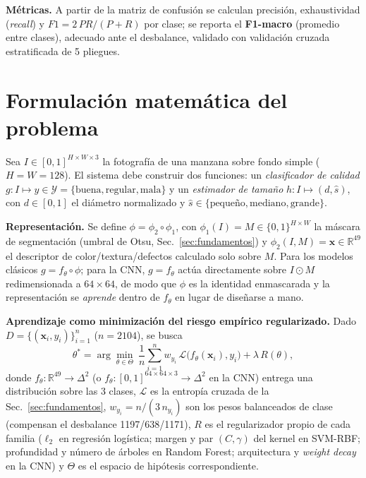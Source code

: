 \documentclass[conference]{IEEEtran}
\begin{document}
\textbf{Métricas.} A partir de la matriz de confusión se calculan precisión,
exhaustividad (\emph{recall}) y $F1=2\,PR/(P+R)$ por clase; se reporta el
\textbf{F1-macro} (promedio entre clases), adecuado ante el desbalance, validado
con validación cruzada estratificada de 5 pliegues.

\section{Formulación matemática del problema}
\label{sec:formulacion}
Sea $I\in[0,1]^{H\times W\times 3}$ la fotografía de una manzana sobre fondo
simple ($H=W=128$). El sistema debe construir dos funciones: un
\emph{clasificador de calidad} $g:I\mapsto y\in\mathcal{Y}=\{\text{buena},
\text{regular},\text{mala}\}$ y un \emph{estimador de tamaño}
$h:I\mapsto(d,\hat s)$, con $d\in[0,1]$ el diámetro normalizado y $\hat
s\in\{\text{pequeño},\text{mediano},\text{grande}\}$.

\textbf{Representación.} Se define $\phi=\phi_2\circ\phi_1$, con
$\phi_1(I)=M\in\{0,1\}^{H\times W}$ la máscara de segmentación (umbral de Otsu,
Sec.~\ref{sec:fundamentos}) y $\phi_2(I,M)=\mathbf{x}\in\mathbb{R}^{49}$ el
descriptor de color/textura/defectos calculado solo sobre $M$. Para los modelos
clásicos $g=f_\theta\circ\phi$; para la CNN, $g=f_\theta$ actúa directamente
sobre $I\odot M$ redimensionada a $64\times64$, de modo que $\phi$ es la
identidad enmascarada y la representación se \emph{aprende} dentro de
$f_\theta$ en lugar de diseñarse a mano.

\textbf{Aprendizaje como minimización del riesgo empírico regularizado.} Dado
$D=\{(\mathbf{x}_i,y_i)\}_{i=1}^{n}$ ($n=2104$), se busca
\[
\theta^\ast=\arg\min_{\theta\in\Theta}\ \frac{1}{n}\sum_{i=1}^{n}
w_{y_i}\,\mathcal{L}\big(f_\theta(\mathbf{x}_i),y_i\big)+\lambda\,R(\theta),
\]
donde $f_\theta:\mathbb{R}^{49}\to\Delta^{2}$ (o
$f_\theta:[0,1]^{64\times64\times3}\to\Delta^{2}$ en la CNN) entrega una
distribución sobre las 3 clases, $\mathcal{L}$ es la entropía cruzada de la
Sec.~\ref{sec:fundamentos}, $w_{y_i}=n/(3\,n_{y_i})$ son los pesos balanceados
de clase (compensan el desbalance 1197/638/1171), $R$ es el regularizador
propio de cada familia ($\ell_2$ en regresión logística; margen y par
$(C,\gamma)$ del kernel en SVM-RBF; profundidad y número de árboles en Random
Forest; arquitectura y \emph{weight decay} en la CNN) y $\Theta$ es el espacio
de hipótesis correspondiente.
\end{document}
